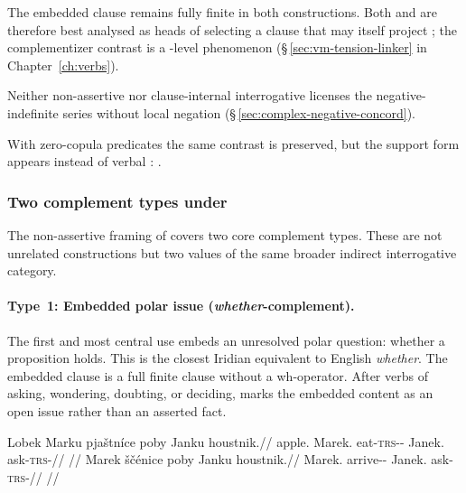 \begin{center}
\end{center}

The embedded clause remains fully finite in both constructions. Both 
and  are therefore best analysed as heads of  selecting a
clause that may itself project ; the complementizer contrast is a
-level phenomenon (§\,\ref{sec:vm-tension-linker} in
Chapter~\ref{ch:verbs}).

Neither non-assertive  nor clause-internal interrogative 
licenses the negative-indefinite series without local negation
(§\,\ref{sec:complex-negative-concord}).

With zero-copula predicates the same contrast is preserved, but the support form
 appears instead of verbal : .

\subsubsection{Two complement types under }

The non-assertive framing of  covers two core complement types. These
are not unrelated constructions but two values of the same broader indirect
interrogative category.

\paragraph{Type~1: Embedded polar issue (\textit{whether}-complement).} The
first and most central use embeds an unresolved polar question: whether a
proposition holds. This is the closest Iridian equivalent to English
\textit{whether}. The embedded clause is a full finite clause without a
wh-operator. After verbs of asking, wondering, doubting, or deciding, 
marks the embedded content as an open issue rather than an asserted fact.

\pex
\a
\begingl
\gla Lobek Marku pjaštníce poby Janku houstnik.//
\glb apple.\Dir{} Marek.\Trs{} eat-\textsc{trs}-\Pf{}-\Lnk{} \Compl{} Janek.\Trs{} ask-\textsc{trs}-\Pf{}//
\glft {}//
\endgl
\a
\begingl
\gla Marek ščénice poby Janku houstnik.//
\glb Marek.\Dir{} arrive-\Pf{}-\Lnk{} \Compl{} Janek.\Trs{} ask-\textsc{trs}-\Pf{}//
\glft {}//
\endgl
\xe

